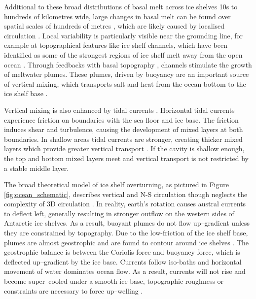 Additional to these broad distributions of basal melt across ice shelves 10s to hundreds of kilometres wide, large changes in basal melt can be found over spatial scales of hundreds of metres \citep[e.g.][]{marsh2016high,stanton2013channelized,stewart2019basal}, which are likely caused by localised circulation \citep{sergienko2013regular}. Local variability is particularly visible near the grounding line, for example at topographical features like ice shelf channels, which have been identified as some of the strongest regions of ice shelf melt away from the open ocean \citep[e.g.][]{marsh2016high, stanton2013channelized}. 
Through feedbacks with basal topography \citep{sergienko2013regular},  channels stimulate the growth of meltwater plumes. These plumes, driven by buoyancy are an important source of vertical mixing, which transports salt and heat from the ocean bottom to the ice shelf base \citep{macayeal1984thermohaline}.



Vertical mixing is also enhanced by tidal currents \citep{macayeal1984thermohaline}.  Horizontal tidal currents experience friction on boundaries with the sea floor and ice base. The friction induces shear and turbulence, causing the development of mixed layers at both boundaries. In shallow areas tidal currents are stronger, creating  thicker mixed layers which provide greater vertical transport  \citep{makinson2002modeling}. If the cavity is shallow enough, the top and bottom mixed layers meet and vertical transport is not restricted by a stable middle layer.

The broad theoretical model of ice shelf overturning, as pictured in Figure \ref{fig:ocean_schematic}, describes vertical and N-S circulation though neglects the complexity of 3D circulation \citep{holland2006effects}. In reality, earth's rotation causes austral currents to deflect left, generally resulting in stronger outflow on the western sides of Antarctic ice shelves. As a result, buoyant plumes do not flow up--gradient unless they are constrained by topography. Due to the low-friction of the ice shelf base, plumes are almost geostrophic and are found to contour around ice shelves \citep{jenkins2016simple}. The geostrophic balance is between the Coriolis force and buoyancy force, which is deflected up--gradient by the ice base. Currents follow iso-baths and horizontal movement of water dominates ocean flow. As a result, currents will not rise and become super--cooled under a smooth ice base, topographic roughness or constraints are necessary to force up--welling \citep{holland2006effects}.

